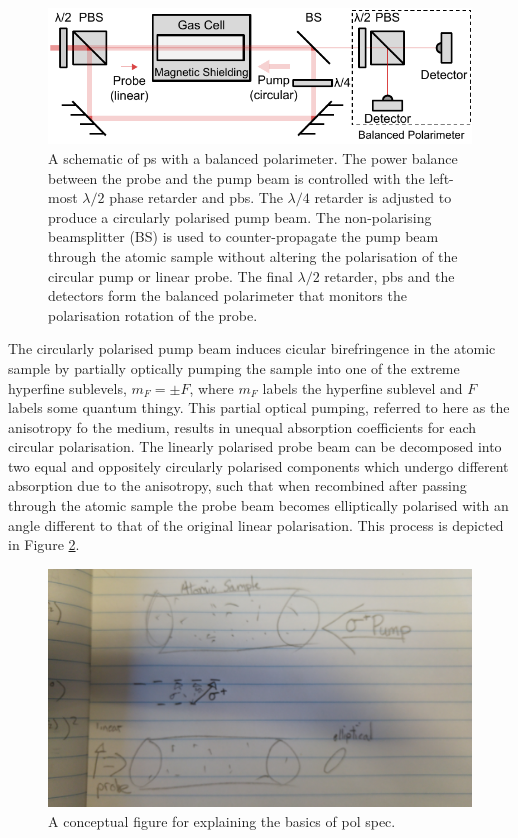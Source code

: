 \begin{figure}
\centering
\includegraphics[width=\linewidth]{chapter1/Figs/PolSpecSchematic.pdf}
\caption{A schematic of \gls{ps} with a balanced polarimeter.
The power balance between the probe and the pump beam is controlled with the left-most $\lambda/2$ phase retarder and \gls{pbs}.
The $\lambda/4$ retarder is adjusted to produce a circularly polarised pump beam.
The non-polarising beamsplitter (BS) is used to counter-propagate the pump beam through the atomic sample without altering the polarisation of the circular pump or linear probe.
The final $\lambda/2$ retarder, \gls{pbs} and the detectors form the balanced polarimeter that monitors the polarisation rotation of the probe.}
\label{figure:pol_spec_schematic}
\end{figure}

The circularly polarised pump beam induces cicular birefringence in the atomic sample by partially optically pumping the sample into one of the extreme hyperfine sublevels, $m_F=\pm F$, where $m_F$ labels the hyperfine sublevel and $F$ labels {\color{red}some quantum thingy.}
This partial optical pumping, referred to here as the anisotropy fo the medium, results in unequal absorption coefficients for each circular polarisation.
The linearly polarised probe beam can be decomposed into two equal and oppositely circularly polarised components which undergo different absorption due to the anisotropy, such that when recombined after passing through the atomic sample the probe beam becomes elliptically polarised with an angle different to that of the original linear polarisation.
This process is depicted in Figure \ref{figure:pol_spec_explanation}.

\begin{figure}
\centering
\includegraphics[width=\linewidth,angle=180]{chapter1/Figs/pol_spec_explanation_placeholder.jpg}
\caption{A conceptual figure for explaining the basics of pol spec.}
\label{figure:pol_spec_explanation}
\end{figure}

